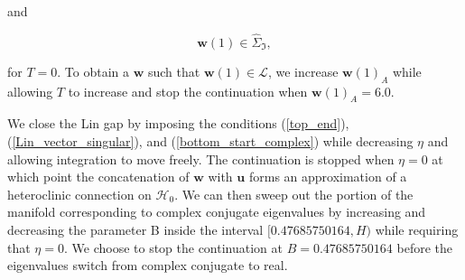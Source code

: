 \documentclass{ws-ijbc}
\begin{document}
and

\begin{equation}
	\mathbf{w}(1) \in \widehat{\Sigma}_{\Im},
\end{equation}

\noindent
for $T=0$.  To obtain a $\mathbf{w}$ such that $\mathbf{w}(1) \in \mathscr{L}$, we increase $\mathbf{w}(1)_A$ while allowing $T$ to increase and stop the continuation when $\mathbf{w}(1)_A=6.0$.

We close the Lin gap by imposing the conditions (\ref{top_end}), (\ref{Lin_vector_singular}), and (\ref{bottom_start_complex}) while decreasing $\eta$ and allowing integration to move freely.  The continuation is stopped when $\eta=0$ at which point the concatenation of $\mathbf{w}$ with $\mathbf{u}$ forms an approximation of a heteroclinic connection on $\mathscr{H}_0$.  We can then sweep out the portion of the manifold corresponding to complex conjugate eigenvalues by increasing and decreasing the parameter B inside the interval $[0.47685750164, H)$ while requiring that $\eta=0$.  We choose to stop the continuation at $B=0.47685750164$ before the eigenvalues switch from complex conjugate to real.
\end{document}

